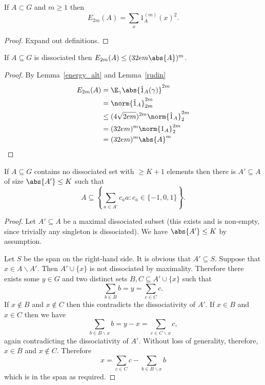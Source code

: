 \begin{lemma}
\label{energy_alt}
\leanok
If $A\subset G$ and $m\geq 1$ then
\[E_{2m}(A) = \sum_x 1_A^{(m)}(x)^2.\]
\end{lemma}

\begin{proof}
\leanok
Expand out definitions.
\end{proof}


\begin{lemma}
\label{diss_energy}
\leanok
If $A\subseteq G$ is dissociated then $E_{2m}(A) \le (32e m \abs{A})^m$.
\end{lemma}
\begin{proof}
\leanok
By Lemma~\ref{energy_alt} and Lemma~\ref{rudin}
\begin{align*}
  E_{2m}(A)
  & = \E_\gamma \abs{\hat 1_A(\gamma)}^{2m} \\
  & = \norm{\hat 1_A}_{2m}^{2m} \\
  & \le (4\sqrt{2em})^{2m} \norm{\hat 1_A}_2^{2m} \\
  & = (32em)^m \norm{1_A}_2^{2m} \\
  & = (32em)^m \abs{A}^m
\end{align*}
\end{proof}


\begin{lemma}
\label{diss_span}
\leanok
If $A\subseteq G$ contains no dissociated set with $\geq K+1$ elements then there is $A'\subseteq A$ of size $\abs{A'}\le K$ such that
\[A\subseteq \left\{ \sum_{a\in A'}c_aa : c_a\in \{-1,0,1\} \right\}.\]
\end{lemma}

\begin{proof}
\leanok
Let $A'\subseteq A$ be a maximal dissociated subset (this exists and is non-empty, since trivially any singleton is dissociated). We have $\abs{A'}\le K$ by assumption.

Let $S$ be the span on the right-hand side. It is obvious that $A'\subseteq S$. Suppose that $x\in A\backslash A'$. Then $A'\cup\{x\}$ is not dissociated by maximality. Therefore there exists some $y\in G$ and two distinct sets $B,C\subseteq A'\cup \{x\}$ such that
\[\sum_{b\in B}b = y = \sum_{c\in C} c.\]
If $x\not\in B$ and $x\not\in C$ then this contradicts the dissociativity of $A'$. If $x\in B$ and $x\in C$ then we have
\[\sum_{b\in B\backslash x}b=y-x=\sum_{c\in C\backslash x}c,\]
again contradicting the dissociativity of $A'$. Without loss of generality, therefore, $x\in B$ and $x\not\in C$. Therefore
\[x=\sum_{c\in C}c - \sum_{b\in B\backslash x}b\]
which is in the span as required.
\end{proof}



